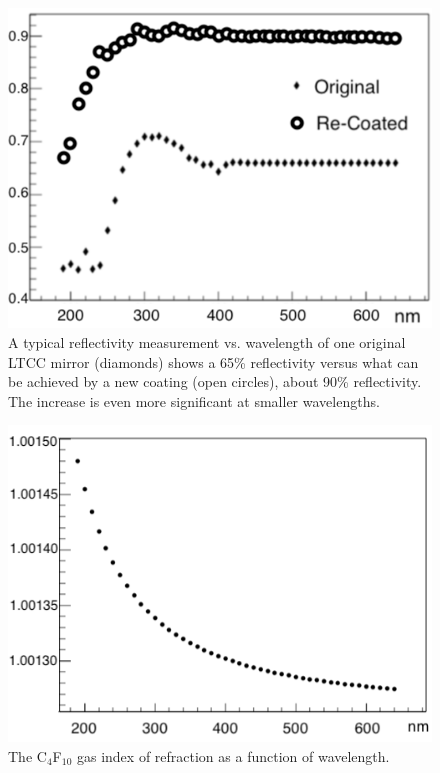\begin{figure}
	\centering
	\includegraphics[width=0.98\columnwidth, height=0.7\columnwidth]{img/reflectivityGain.png}
	\caption{A typical reflectivity measurement vs. wavelength of one original LTCC mirror (diamonds) shows a
          65\% reflectivity versus what can be achieved by a new coating (open circles), about 90\% reflectivity. The
          increase is even more significant at smaller wavelengths.}
	\label{fig:reflectivityGain}
\end{figure}

\begin{figure}[htbp]
	\centering
	\includegraphics[width=0.98\columnwidth, height=0.65\columnwidth]{img/c4f10RefrIndex.png}
	\caption{The C$_4$F$_{10}$ gas index of refraction as a function of wavelength.}
	\label{fig:c4f10RefrIndex}
\end{figure}

